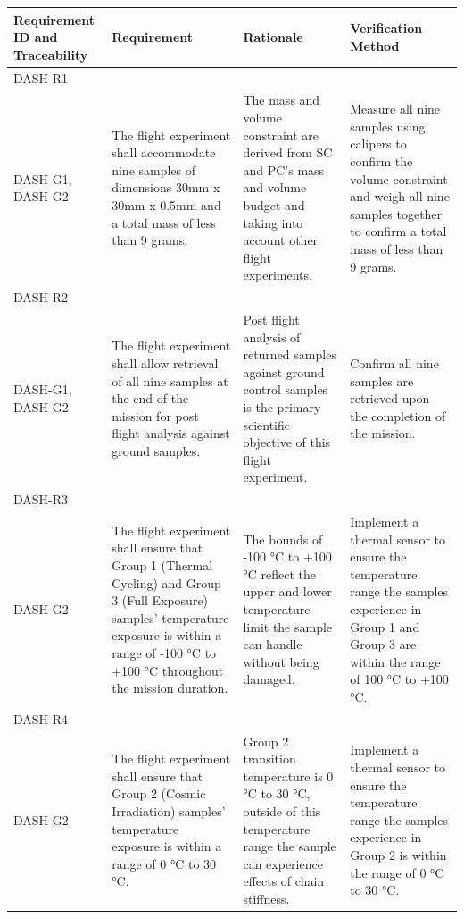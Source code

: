 \documentclass[conf]{new-aiaa}
\begin{document}
\begin{table}[H]
    \centering
    \footnotesize
    \setlength{\tabcolsep}{4pt}
    \renewcommand{\arraystretch}{1.15}
    \begin{tabularx}{\textwidth}{@{}>{\raggedright\arraybackslash}m{2.4cm}YYY@{}}
    \toprule
    \textbf{Requirement ID and Traceability} & \textbf{Requirement} & \textbf{Rationale} & \textbf{Verification Method} \\
    \midrule
    DASH-R1\\DASH-G1, DASH-G2 &
    The flight experiment shall accommodate nine samples of dimensions 30mm x 30mm x 0.5mm and a total mass of less than 9 grams. &
    The mass and volume constraint are derived from SC and PC's mass and volume budget and taking into account other flight experiments. &
    Measure all nine samples using calipers to confirm the volume constraint and weigh all nine samples together to confirm a total mass of less than 9 grams. \\ \hline

    DASH-R2\\DASH-G1, DASH-G2 &
    The flight experiment shall allow retrieval of all nine samples at the end of the mission for post flight analysis against ground samples. &
    Post flight analysis of returned samples against ground control samples is the primary scientific objective of this flight experiment. &
    Confirm all nine samples are retrieved upon the completion of the mission. \\ \hline

    DASH-R3\\DASH-G2 &
    The flight experiment shall ensure that Group 1 (Thermal Cycling) and Group 3 (Full Exposure) samples' temperature exposure is within a range of -100 °C to +100 °C throughout the mission duration. &
    The bounds of -100 °C to +100 °C reflect the upper and lower temperature limit the sample can handle without being damaged. &
    Implement a thermal sensor to ensure the temperature range the samples experience in Group 1 and Group 3 are within the range of 100 °C to +100 °C. \\ \hline

    DASH-R4\\DASH-G2 &
    The flight experiment shall ensure that Group 2 (Cosmic Irradiation) samples' temperature exposure is within a range of 0 °C to 30 °C. &
    Group 2 transition temperature is 0  °C to 30 °C, outside of this temperature range the sample can experience effects of chain stiffness. &
    Implement a thermal sensor to ensure the temperature range the samples experience in Group 2 is within the range of 0 °C to 30 °C. \\ \hline


\end{tabularx}
\end{table}
\end{document}
